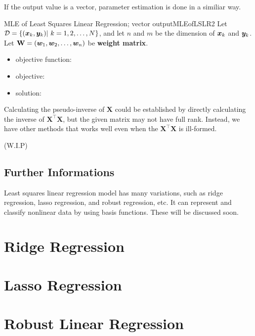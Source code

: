 \documentclass{report}
\begin{document}
            If the output value is a vector, parameter estimation is done in a similiar way.

            \begin{thm}{MLE of Least Squares Linear Regression; vector output}{MLEofLSLR2}
                Let $\mathcal D=\{(\boldsymbol{x}_k, \boldsymbol{y}_k)|\ k = 1, 2, \ldots, N\}$, and let $n$ and $m$ be the dimension of $\boldsymbol{x}_k$ and $\boldsymbol{y}_k$.
                Let $\textbf{W} = (\boldsymbol{w}_1, \boldsymbol{w}_2, \ldots, \boldsymbol{w}_n)$ be \textbf{weight matrix}.
                \begin{itemize}
                    \item objective function:
                    \item objective:
                    \item solution:
                \end{itemize}
            \end{thm}
        
        Calculating the pseudo-inverse of $\textbf{X}$ could be established by directly calculating the inverse of $\textbf{X}^{\top}\textbf{X}$,
        but the given matrix may not have full rank.
        Instead, we have other methods that works well even when the $\textbf{X}^{\top}\textbf{X}$ is ill-formed.
        
        (W.I.P)
        
        \subsection{Further Informations}
            
            Least squares linear regression model has many variations, such as ridge regression, lasso regression, and robust regression, etc.
            It can represent and classify nonlinear data by using basis functions.
            These will be discussed soon.

    \section{Ridge Regression}

    \section{Lasso Regression}

    \section{Robust Linear Regression}
\end{document}
